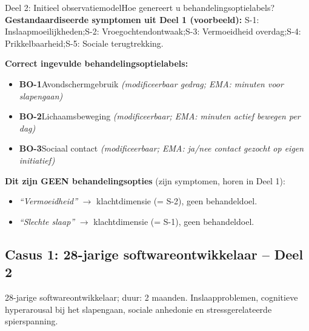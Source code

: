 \documentclass[11pt,a4paper]{article}
\begin{document}
\vspace{0.5em}
\nopagebreak[4]

\begin{voorbeeldbox}{Deel 2: Initieel observatiemodel}{Hoe genereert u behandelingsoptielabels?}
\small
\textbf{Gestandaardiseerde symptomen uit Deel 1 (voorbeeld):}
S-1: Inslaapmoeilijkheden;\enspace S-2: Vroegochtendontwaak;\enspace S-3: Vermoeidheid overdag;\enspace S-4: Prikkelbaarheid;\enspace S-5: Sociale terugtrekking.

\medskip
\textbf{Correct ingevulde behandelingsoptielabels:}
\begin{itemize}[topsep=2pt,itemsep=1pt]
\item \textbf{BO-1}\enspace Avondschermgebruik
  \hfill\textit{(modificeerbaar gedrag; EMA: minuten voor slapengaan)}
\item \textbf{BO-2}\enspace Lichaamsbeweging
  \hfill\textit{(modificeerbaar; EMA: minuten actief bewegen per dag)}
\item \textbf{BO-3}\enspace Sociaal contact
  \hfill\textit{(modificeerbaar; EMA: ja/nee contact gezocht op eigen initiatief)}
\end{itemize}

\medskip
\textbf{\color{StrongRed}Dit zijn GEEN behandelingsopties} (zijn symptomen, horen in Deel 1):
\begin{itemize}[topsep=1pt,itemsep=0pt]
\item \textit{``Vermoeidheid''} $\rightarrow$ klachtdimensie (= S-2), geen behandeldoel.
\item \textit{``Slechte slaap''} $\rightarrow$ klachtdimensie (= S-1), geen behandeldoel.
\end{itemize}
\end{voorbeeldbox}

\vspace{0.5em}

\newpage
\subsection*{Casus 1: 28-jarige softwareontwikkelaar -- Deel 2}

\begin{complaintbox}[title={Casus 1: verkorte klachtomschrijving}]
\small 28-jarige softwareontwikkelaar; duur: 2 maanden. Inslaapproblemen, cognitieve hyperarousal bij het slapengaan, sociale anhedonie en stressgerelateerde spierspanning.
\end{complaintbox}
\end{document}
